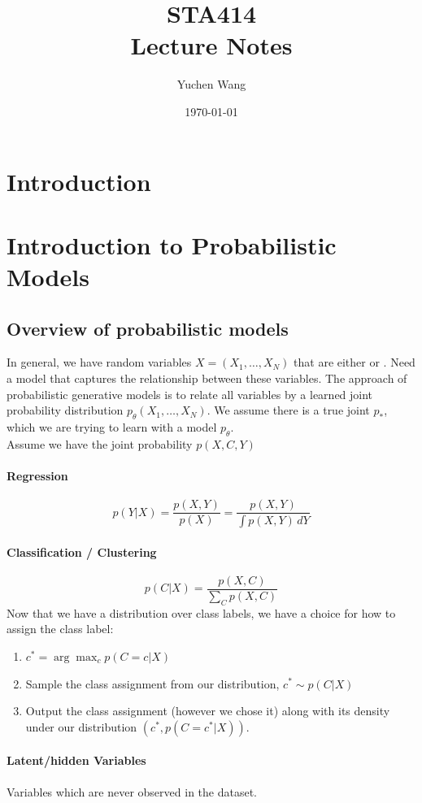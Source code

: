 \documentclass[11pt]{article}
\title{STA414\\ Lecture Notes}
\author{Yuchen Wang}
\date{\today}
\begin{document}
    \maketitle
    \tableofcontents
    \newpage

\section{Introduction}
\section{Introduction to Probabilistic Models}
\subsection{Overview of probabilistic models}
In general, we have random variables $X = (X_1, \hdots, X_N)$ that are either  or . Need a model that captures the relationship between these variables. The approach of probabilistic generative models is to relate all variables by a learned joint probability distribution $p_\theta(X_1, \hdots, X_N)$. We assume there is a true joint $p_*$, which we are trying to learn with a model $p_\theta$. \\
Assume we have the joint probability $p(X,C,Y)$
\paragraph{Regression}
$$p(Y|X) = \frac{p(X,Y)}{p(X)} = \frac{p(X,Y)}{\int p(X,Y)\, dY}$$

\paragraph{Classification / Clustering}
$$p(C|X) = \frac{p(X,C)}{\sum_C p(X,C)}$$
Now that we have a distribution over class labels, we have a choice for how to assign the class label:
\begin{enumerate}
	\item $c^* = \arg \max_c p(C=c|X)$
	\item Sample the class assignment from our distribution, $c^* \sim p(C|X)$
	\item Output the class assignment (however we chose it) along with its density under our distribution $(c^*, p(C=c^*|X))$. 
\end{enumerate}

\paragraph{Latent/hidden Variables}
Variables which are never observed in the dataset.
\end{document}
